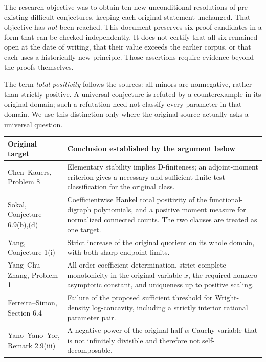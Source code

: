 \documentclass[11pt,a4paper]{article}
\theoremstyle{definition}
\theoremstyle{remark}
\numberwithin{equation}{section}
\begin{document}
The research objective was to obtain ten new unconditional resolutions of
pre-existing difficult conjectures, keeping each original statement unchanged.
That objective has \emph{not} been reached. This document preserves six
proof candidates in a form that can be checked independently. It does not
certify that all six remained open at the date of writing, that their value
exceeds the earlier corpus, or that each uses a historically new principle.
Those assertions require evidence beyond the proofs themselves.

The term \emph{total positivity} follows the sources: all minors are
nonnegative, rather than strictly positive. A universal conjecture is
refuted by a counterexample in its original domain; such a refutation need
not classify every parameter in that domain. We use this distinction only
where the original source actually asks a universal question.

\begin{center}
\small
\begin{tabular}{@{}p{}p{}@{}}
\toprule
Original target & Conclusion established by the argument below\\
\midrule
Chen--Kauers, Problem 8 & Elementary stability implies D-finiteness;
an adjoint-moment criterion gives a necessary and sufficient finite-test
classification for the original class.\\[5pt]
Sokal, Conjecture 6.9(b),(d) & Coefficientwise Hankel total positivity of the
functional-digraph polynomials, and a positive moment measure for normalized
connected counts. The two clauses are treated as one target.\\[5pt]
Yang, Conjecture 1(i) & Strict increase of the original quotient on its whole
domain, with both sharp endpoint limits.\\[5pt]
Yang--Chu--Zhang, Problem 1 & All-order coefficient determination,
strict complete monotonicity in the original variable $x$, the required
nonzero asymptotic constant, and uniqueness up to positive scaling.\\[5pt]
Ferreira--Simon, Section 6.4 & Failure of the proposed sufficient threshold
for Wright-density log-concavity, including a strictly interior rational
parameter pair.\\[5pt]
Yano--Yano--Yor, Remark 2.9(iii) & A negative power of the original
half-$\alpha$-Cauchy variable that is not infinitely divisible and therefore
not self-decomposable.\\
\bottomrule
\end{tabular}
\end{center}
\end{document}
